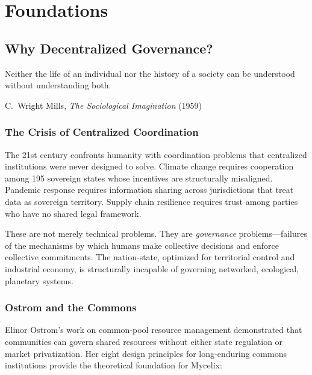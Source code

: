 \documentclass[12pt]{book}
\begin{document}
\mainmatter


\part{Foundations}

\chapter{Why Decentralized Governance?}

\epigraph{Neither the life of an individual nor the history of a society can be
understood without understanding both.}{C.\ Wright Mills, \textit{The Sociological
Imagination} (1959)}

\section{The Crisis of Centralized Coordination}

The 21st century confronts humanity with coordination problems that centralized
institutions were never designed to solve. Climate change requires cooperation
among 195 sovereign states whose incentives are structurally misaligned. Pandemic
response requires information sharing across jurisdictions that treat data as
sovereign territory. Supply chain resilience requires trust among parties who
have no shared legal framework.

These are not merely technical problems. They are \emph{governance} problems---failures
of the mechanisms by which humans make collective decisions and enforce collective
commitments. The nation-state, optimized for territorial control and industrial
economy, is structurally incapable of governing networked, ecological, planetary
systems.

\section{Ostrom and the Commons}

Elinor Ostrom's work on common-pool resource management demonstrated that
communities can govern shared resources without either state regulation or
market privatization. Her eight design principles for long-enduring commons
institutions provide the theoretical foundation for Mycelix:
\end{document}
